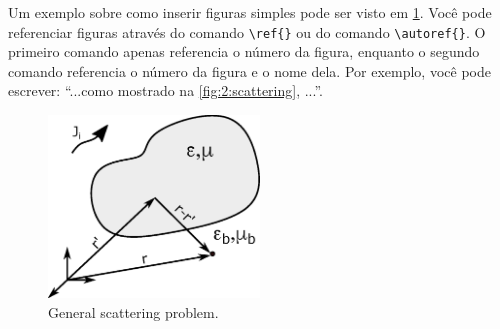 		Um exemplo sobre como inserir figuras simples pode ser visto em \ref{fig:2:scattering}. Você pode referenciar figuras através do comando \verb|\ref{}| ou do comando \verb|\autoref{}|. O primeiro comando apenas referencia o número da figura, enquanto o segundo comando referencia o número da figura e o nome dela. Por exemplo, você pode escrever: ``...como mostrado na \autoref{fig:2:scattering}, ...''.
		\begin{figure}[!tb]
			\centering
			\includegraphics[width=0.5\textwidth]{./figuras/scattering}
			\caption{General scattering problem.}
			\label{fig:2:scattering}
		\end{figure}

